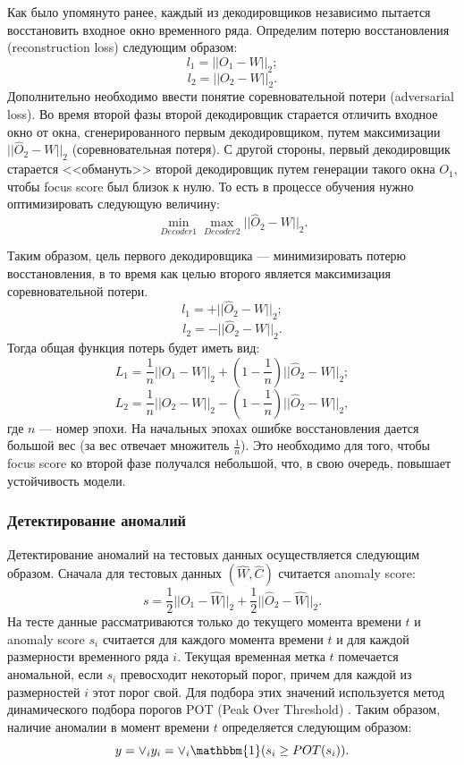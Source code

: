 \documentclass{article}
\begin{document}
Как было упомянуто ранее, каждый из декодировщиков независимо пытается восстановить входное окно временного ряда. Определим потерю восстановления (reconstruction loss) следующим образом: 
$$
l_1 = ||O_1 - W||_2;
$$
$$
l_2 = ||O_2 - W||_2.
$$
Дополнительно необходимо ввести понятие соревновательной потери (adversarial loss). Во время второй фазы второй декодировщик старается отличить входное окно от окна, сгенерированного первым декодировщиком, путем максимизации $||\hat{O}_2 - W||_2$ (соревновательная потеря). С другой стороны, первый декодировщик старается <<обмануть>> второй декодировщик путем генерации такого окна $O_1$, чтобы focus score был близок к нулю. То есть в процессе обучения нужно оптимизировать следующую величину: 
$$
\min_{Decoder1} \max_{Decoder2} ||\hat{O}_2 - W||_2.
$$

Таким образом, цель первого декодировщика --- минимизировать потерю восстановления, в то время как целью второго является максимизация соревновательной потери. 
$$
l_1 = +||\hat{O}_2 - W||_2;
$$
$$
l_2 = -||\hat{O}_2 - W||_2.
$$
Тогда общая функция потерь будет иметь вид:
$$
L_1 = \frac{1}{n}||O_1 - W||_2 + (1 - \frac{1}{n})||\hat{O}_2 - W||_2;
$$
$$
L_2 = \frac{1}{n}||O_2 - W||_2 - (1 - \frac{1}{n})||\hat{O}_2 - W||_2,
$$
где $n$ --- номер эпохи. На начальных эпохах ошибке восстановления дается большой вес (за вес отвечает множитель $\frac{1}{n}$). Это необходимо для того, чтобы focus score ко второй фазе получался небольшой, что, в свою очередь, повышает устойчивость модели.


\subsubsection{Детектирование аномалий}

Детектирование аномалий на тестовых данных осуществляется следующим образом. Сначала для тестовых данных $(\hat{W}, \hat{C})$ считается anomaly score: 
$$
s = \frac{1}{2}||O_1 - \hat{W}||_2 + \frac{1}{2}||\hat{O}_2 - \hat{W}||_2.
$$
На тесте данные рассматриваются только до текущего момента времени $t$ и anomaly score $s_i$ считается для каждого момента времени $t$ и для каждой размерности временного ряда $i$. Текущая временная метка $t$ помечается аномальной, если $s_i$ превосходит некоторый порог, причем для каждой из размерностей $i$ этот порог свой. Для подбора этих значений используется метод динамического подбора порогов POT (Peak Over Threshold) \citep{POT}. Таким образом, наличие аномалии в момент времени $t$ определяется следующим образом: 
$$
y = \lor_{i} y_i = \lor_{i} \mathbbm{1}(s_i \geq POT(s_i)). 
$$
\end{document}
